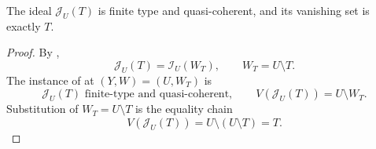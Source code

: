 \begin{lemma}
  \label{lemma:nagata-constructible-closed-support}
  \lean{}

  The ideal $\mathcal J_U(T)$ is finite type and quasi-coherent, and its
  vanishing set is exactly $T$.
\end{lemma}

\begin{proof}
  By ,
  \[
    \mathcal J_U(T)=\mathcal I_U(W_T),
    \qquad W_T=U\setminus T.
  \]
  The instance of  at
  $(Y,W)=(U,W_T)$ is
  \[
    \mathcal J_U(T)\text{ finite-type and quasi-coherent},
    \qquad
    V(\mathcal J_U(T))=U\setminus W_T.
  \]
  Substitution of $W_T=U\setminus T$ is the equality chain
  \[
    V(\mathcal J_U(T))
      =U\setminus(U\setminus T)=T.
  \]
\end{proof}

